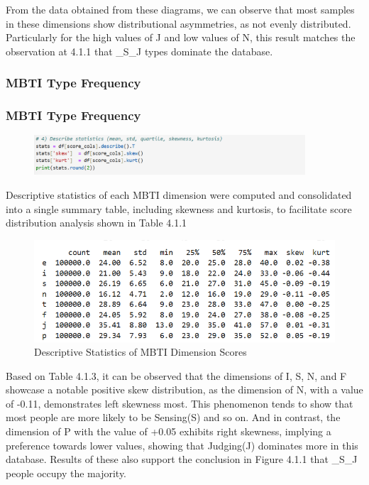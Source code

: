 \documentclass[12pt]{article}
\begin{document}
	From the data obtained from these diagrams, we can observe that most samples in these dimensions show distributional asymmetries, as not evenly distributed. Particularly for the high values of J and low values of N, this result matches the observation at 4.1.1 that \_S\_J types dominate the database.
	
	\subsubsection{MBTI Type Frequency}
	\subsubsection{MBTI Type Frequency}
	\begin{figure}[H]
	\centering
	\includegraphics[width=0.9\textwidth]{Q1EDA5}
	
	\end{figure}	
	
	Descriptive statistics of each MBTI dimension were computed and consolidated into a single summary table, including skewness and kurtosis, to facilitate score distribution analysis shown in Table 4.1.1
	\begin{figure}[H]
		\centering
		\includegraphics{Q1EDA6} 
		\caption{Descriptive Statistics of MBTI Dimension Scores}		
	\end{figure}
	
	Based on Table 4.1.3, it can be observed that the dimensions of I, S, N, and F showcase a notable positive skew distribution, as the dimension of N, with a value of -0.11, demonstrates left skewness most. This phenomenon tends to show that most people are more likely to be Sensing(S) and so on. And in contrast, the dimension of P with the value of +0.05 exhibits right skewness, implying a preference towards lower values, showing that Judging(J) dominates more in this database. Results of these also support the conclusion in Figure 4.1.1 that \_S\_J people occupy the majority.
	
\end{document}
